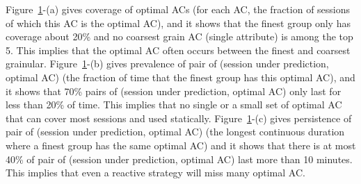 Figure~\ref{fig:optimal-ac-dynamics}-(a) gives coverage of optimal ACs (for each AC, the fraction of sessions of which this AC is the optimal AC), and it shows that the finest group only has coverage about 20\% and no coarsest grain AC (single attribute) is among the top 5. This implies that the optimal AC often occurs between the finest and coarsest grainular.
Figure~\ref{fig:optimal-ac-dynamics}-(b) gives prevalence of pair of (session under prediction, optimal AC) (the fraction of time that the finest group has this optimal AC), and it shows that 70\% pairs of (session under prediction, optimal AC) only last for less than 20\% of time. This implies that no single or a small set of optimal AC that can cover most sessions and used statically.
Figure~\ref{fig:optimal-ac-dynamics}-(c) gives persistence of pair of (session under prediction, optimal AC) (the longest continuous duration where a finest group has the same optimal AC) and it shows that there is at most 40\% of pair of (session under prediction, optimal AC) last more than 10 minutes. This implies that even a reactive strategy will miss many optimal AC.

\begin{figure}[h!]
\centering
{}
\label{fig:optimal-ac-dynamics}
\end{figure}

